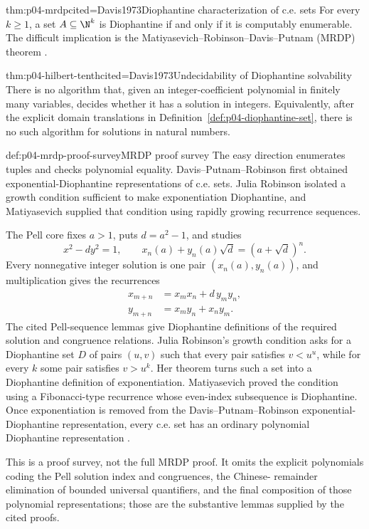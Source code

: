 \begin{hbtheorem}{thm:p04-mrdp}{cited=Davis1973}{Diophantine characterization of c.e. sets}
For every \(k\geq1\), a set \(A\subseteq\N^k\) is Diophantine if and only if
it is computably enumerable.  The difficult implication is the
Matiyasevich--Robinson--Davis--Putnam (MRDP) theorem
\cite{DavisPutnamRobinson1961,Matiyasevich1970}.
\end{hbtheorem}

\begin{hbcorollary}{thm:p04-hilbert-tenth}{cited=Davis1973}{Undecidability of Diophantine solvability}
There is no algorithm that, given an integer-coefficient polynomial in
finitely many variables, decides whether it has a solution in integers.
Equivalently, after the explicit domain translations in
Definition~\ref{def:p04-diophantine-set}, there is no such algorithm for
solutions in natural numbers.
\end{hbcorollary}

\begin{hbmethod}{def:p04-mrdp-proof-survey}{MRDP proof survey}
The easy direction enumerates tuples and checks polynomial equality.
Davis--Putnam--Robinson first obtained exponential-Diophantine
representations of c.e. sets.  Julia Robinson isolated a growth condition
sufficient to make exponentiation Diophantine, and Matiyasevich supplied that
condition using rapidly growing recurrence sequences.

The Pell core fixes \(a>1\), puts \(d=a^2-1\), and studies
\[
 x^2-dy^2=1,
 \qquad
 x_n(a)+y_n(a)\sqrt d=(a+\sqrt d)^n.
\]
Every nonnegative integer solution is one pair
\((x_n(a),y_n(a))\), and multiplication gives the recurrences
\[
\begin{aligned}
 x_{m+n}&=x_mx_n+d\,y_my_n,\\
 y_{m+n}&=x_my_n+x_ny_m.
\end{aligned}
\]
The cited Pell-sequence lemmas give Diophantine definitions of the required
solution and congruence relations.  Julia Robinson's growth condition asks for
a Diophantine set \(D\) of pairs \((u,v)\) such that every pair satisfies
\(v<u^u\), while for every \(k\) some pair satisfies \(v>u^k\).  Her theorem
turns such a set into a Diophantine definition of exponentiation.
Matiyasevich proved the condition using a Fibonacci-type recurrence whose
even-index subsequence is Diophantine.  Once exponentiation is removed from
the Davis--Putnam--Robinson exponential-Diophantine representation, every
c.e. set has an ordinary polynomial Diophantine representation
\cite{DavisPutnamRobinson1961,Matiyasevich1970,Davis1973}.

This is a proof survey, not the full MRDP proof.  It omits the explicit
polynomials coding the Pell solution index and congruences, the Chinese-
remainder elimination of bounded universal quantifiers, and the final
composition of those polynomial representations; those are the substantive
lemmas supplied by the cited proofs.
\end{hbmethod}

